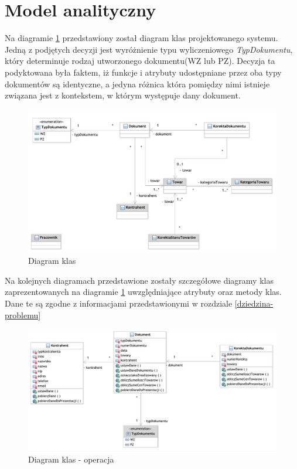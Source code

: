 \section{Model analityczny}

Na diagramie \ref{fig:DiagramKlas} przedstawiony został  diagram klas projektowanego systemu.
Jedną z podjętych decyzji jest wyróżnienie typu wyliczeniowego \textit{TypDokumentu}, który determinuje rodzaj utworzonego dokumentu(WZ lub PZ). Decyzja ta podyktowana była faktem, iż funkcje i atrybuty udostępniane przez oba typy dokumentów są identyczne, a jedyna różnica która pomiędzy nimi istnieje związana jest z kontekstem, w którym występuje dany dokument.

\begin{figure}[!htb]
  \begin{center}
    \includegraphics[scale=0.7]{../img/model/diagram_klas.pdf}
  \end{center}
  \caption{Diagram klas}
  \label{fig:DiagramKlas}
\end{figure}
\FloatBarrier

Na kolejnych diagramach przedstawione zostały szczegółowe diagramy klas zaprezentowanych na diagramie \ref{fig:DiagramKlas} uwzględniające atrybuty oraz metody klas. Dane te są zgodne z informacjami przedstawionymi w rozdziale \ref{dziedzina-problemu}

\begin{figure}[!htb]
  \begin{center}
    \includegraphics[scale=0.7]{../img/model/diagram_operacja.pdf}
  \end{center}
  \caption{Diagram klas - operacja}
  \label{fig:DiagramKlasOperacja}
\end{figure}
\FloatBarrier

